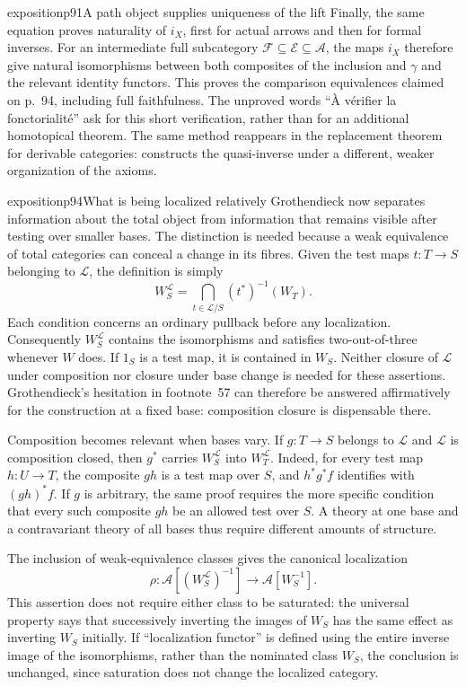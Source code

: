 \begin{dcomment}{exposition}{p91}{A path object supplies uniqueness of the lift}
Finally, the same equation proves naturality of $i_X$, first for actual arrows and then for formal inverses. For an intermediate full subcategory $\mathcal F\subseteq\mathcal E\subseteq\mathcal A$, the maps $i_X$ therefore give natural isomorphisms between both composites of the inclusion and $\gamma$ and the relevant identity functors. This proves the comparison equivalences claimed on p.~94, including full faithfulness. The unproved words ``\`A v\'erifier la fonctorialit\'e'' ask for this short verification, rather than for an additional homotopical theorem. The same method reappears in the replacement theorem for derivable categories: \citet[Proposition~1.8]{Cisinski2010} constructs the quasi-inverse under a different, weaker organization of the axioms.
\end{dcomment}

\begin{dcomment}{exposition}{p94}{What is being localized relatively}
Grothendieck now separates information about the total object from information that remains visible after testing over smaller bases. The distinction is needed because a weak equivalence of total categories can conceal a change in its fibres. Given the test maps $t:T\to S$ belonging to $\mathcal L$, the definition is simply
\[
W_S^{\mathcal L}=\bigcap_{t\in\mathcal L/S}(t^*)^{-1}(W_T).
\]
Each condition concerns an ordinary pullback before any localization. Consequently $W_S^{\mathcal L}$ contains the isomorphisms and satisfies two-out-of-three whenever $W$ does. If $1_S$ is a test map, it is contained in $W_S$. Neither closure of $\mathcal L$ under composition nor closure under base change is needed for these assertions. Grothendieck's hesitation in footnote~57 can therefore be answered affirmatively for the construction at a fixed base: composition closure is dispensable there.

Composition becomes relevant when bases vary. If $g:T\to S$ belongs to $\mathcal L$ and $\mathcal L$ is composition closed, then $g^*$ carries $W_S^{\mathcal L}$ into $W_T^{\mathcal L}$. Indeed, for every test map $h:U\to T$, the composite $gh$ is a test map over $S$, and $h^*g^*f$ identifies with $(gh)^*f$. If $g$ is arbitrary, the same proof requires the more specific condition that every such composite $gh$ be an allowed test over $S$. A theory at one base and a contravariant theory of all bases thus require different amounts of structure.

The inclusion of weak-equivalence classes gives the canonical localization
\[
\rho:\mathcal A[(W_S^{\mathcal L})^{-1}]\longrightarrow
\mathcal A[W_S^{-1}].
\]
This assertion does not require either class to be saturated: the universal property says that successively inverting the images of $W_S$ has the same effect as inverting $W_S$ initially. If ``localization functor'' is defined using the entire inverse image of the isomorphisms, rather than the nominated class $W_S$, the conclusion is unchanged, since saturation does not change the localized category.


\end{dcomment}
